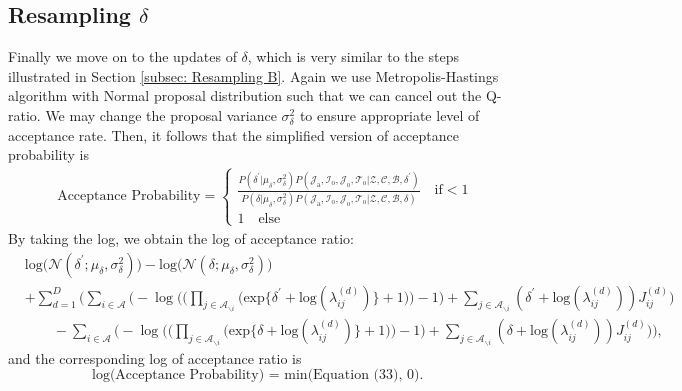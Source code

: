 \documentclass[a4paper]{article}
\begin{document}
  \subsection{Resampling $\delta$ }  \label{subsec: Resampling delta}
Finally we move on to the updates of $\delta$, which is very similar to the steps illustrated in Section \ref{subsec: Resampling B}. Again we use Metropolis-Hastings algorithm with Normal proposal distribution such that we can cancel out the Q-ratio. We may change the proposal variance $\sigma^2_\delta$ to ensure appropriate level of acceptance rate. Then, it follows that the simplified version of acceptance probability is 
\begin{equation} 
	\begin{split}
		& \mbox{Acceptance Probability}=
		\begin{cases}  \frac{P(\delta^\prime|\mu_\delta, \sigma^2_\delta) P(\mathcal{J}_{\mbox{a}}, \mathcal{I}_{\mbox{o}}, \mathcal{J}_{\mbox{o}}, \mathcal{T}_{\mbox{o}} |\mathcal{Z}, \mathcal{C}, \mathcal{B}, \delta^\prime)}{P(\delta|\mu_\delta, \sigma^2_\delta) P(\mathcal{J}_{\mbox{a}}, \mathcal{I}_{\mbox{o}}, \mathcal{J}_{\mbox{o}}, \mathcal{T}_{\mbox{o}} |\mathcal{Z}, \mathcal{C}, \mathcal{B}, \delta)}\quad\text{if}  <1\\
			1 \quad \text{else}
		\end{cases}
	\end{split}
\end{equation}
By taking the log, we obtain the log of acceptance ratio:
\begin{equation}
	\begin{aligned} 
		&\mbox{log}\Big(\mathcal{N}(\delta^\prime;\mu_\delta, \sigma^2_\delta)\Big)-\mbox{log}\Big(\mathcal{N}(\delta; \mu_\delta, \sigma^2_\delta)\Big)\\&+ \sum_{d=1}^D\Bigg(\sum_{i\in \mathcal{A}}\Big(-\log\Big(\Big(\prod_{j \in \mathcal{A}_{\backslash i}} \Big(\mbox{exp}\{\delta^\prime+\mbox{log}(\lambda_{ij}^{(d)})\} + 1\Big)\Big)-1\Big) + \sum_{j \in \mathcal{A}_{\backslash i}} (\delta^\prime+\mbox{log}(\lambda_{ij}^{(d)}))J_{ij}^{(d)}\Big)
		\\&\quad\quad -\sum_{i\in \mathcal{A}}\Big(-\log\Big(\Big(\prod_{j \in \mathcal{A}_{\backslash i}} \Big(\mbox{exp}\{\delta+\mbox{log}(\lambda_{ij}^{(d)})\} + 1\Big)\Big)-1\Big) + \sum_{j \in \mathcal{A}_{\backslash i}} (\delta+\mbox{log}(\lambda_{ij}^{(d)}))J_{ij}^{(d)}\Big)\Bigg),
	\end{aligned}
\end{equation}
and the corresponding log of acceptance ratio is
\begin{equation}
	\mbox{log(Acceptance Probability) = min(Equation (33), 0). }
\end{equation}
\end{document}
